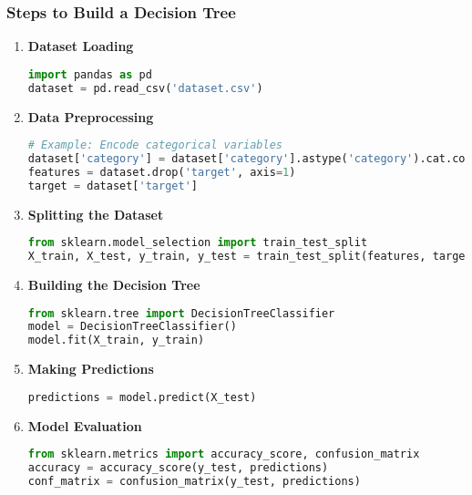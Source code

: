 \documentclass[aspectratio=169]{beamer}
\begin{document}
\begin{frame}[fragile]
    \frametitle{Steps to Build a Decision Tree}
    \begin{enumerate}
        \item \textbf{Dataset Loading}
        \begin{lstlisting}[language=Python]
import pandas as pd
dataset = pd.read_csv('dataset.csv')
        \end{lstlisting}
        
        \item \textbf{Data Preprocessing}
        \begin{lstlisting}[language=Python]
# Example: Encode categorical variables
dataset['category'] = dataset['category'].astype('category').cat.codes
features = dataset.drop('target', axis=1)
target = dataset['target']
        \end{lstlisting}
        
        \item \textbf{Splitting the Dataset}
        \begin{lstlisting}[language=Python]
from sklearn.model_selection import train_test_split
X_train, X_test, y_train, y_test = train_test_split(features, target, test_size=0.3, random_state=42)
        \end{lstlisting}
        
        \item \textbf{Building the Decision Tree}
        \begin{lstlisting}[language=Python]
from sklearn.tree import DecisionTreeClassifier
model = DecisionTreeClassifier()
model.fit(X_train, y_train)
        \end{lstlisting}
        
        \item \textbf{Making Predictions}
        \begin{lstlisting}[language=Python]
predictions = model.predict(X_test)
        \end{lstlisting}
        
        \item \textbf{Model Evaluation}
        \begin{lstlisting}[language=Python]
from sklearn.metrics import accuracy_score, confusion_matrix
accuracy = accuracy_score(y_test, predictions)
conf_matrix = confusion_matrix(y_test, predictions)
        \end{lstlisting}
    \end{enumerate}
\end{frame}
\end{document}
